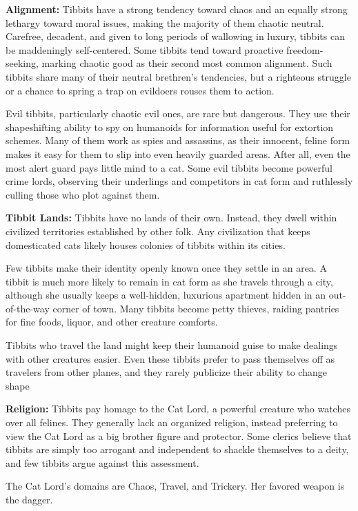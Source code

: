 \textbf{Alignment:} Tibbits have a strong tendency toward chaos and an equally strong lethargy toward moral issues, making the majority of them chaotic neutral. Carefree, decadent, and given to long periods of wallowing in luxury, tibbits can be maddeningly self-centered. Some tibbits tend toward proactive freedom-seeking, marking chaotic good as their second most common alignment. Such tibbits share many of their neutral brethren's tendencies, but a righteous struggle or a chance to spring a trap on evildoers rouses them to action.

Evil tibbits, particularly chaotic evil ones, are rare but dangerous. They use their shapeshifting ability to spy on humanoids for information useful for extortion
schemes. Many of them work as spies and assassins, as their innocent, feline form makes it easy for them to slip into even heavily guarded areas. After all, even the
most alert guard pays little mind to a cat. Some evil tibbits become powerful crime lords, observing their underlings and competitors in cat form and ruthlessly
culling those who plot against them.

\textbf{Tibbit Lands:} Tibbits have no lands of their own. Instead, they dwell within civilized territories established by other folk. Any civilization that keeps
domesticated cats likely houses colonies of tibbits within its cities. 

Few tibbits make their identity openly known once they settle in an area. A tibbit is much more likely to remain in cat form as she travels through a city, although she usually keeps a well-hidden, luxurious apartment hidden in an out-of-the-way corner of town. Many tibbits become petty thieves, raiding pantries for
fine foods, liquor, and other creature comforts.

Tibbits who travel the land might keep their humanoid guise to make dealings with other creatures easier. Even these tibbits prefer to pass themselves off as travelers from other planes, and they rarely publicize their ability to change shape

\textbf{Religion:} Tibbits pay homage to the Cat Lord, a powerful creature who watches over all felines. They generally lack an organized religion, instead preferring to view the Cat Lord as a big brother figure and protector. Some clerics believe that tibbits are simply too arrogant and independent to shackle themselves to a deity, and few tibbits argue against this assessment.

The Cat Lord's domains are Chaos, Travel, and Trickery. Her favored weapon is the dagger. 

